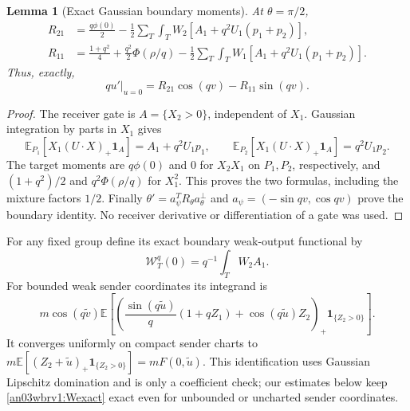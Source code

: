 \documentclass[11pt]{article}
\numberwithin{equation}{section}
\newtheorem{lemma}[theorem]{Lemma}
\theoremstyle{remark}\newtheorem{remark}[theorem]{Remark}
\newcommand{\E}{\mathbb E}\newcommand{\dd}{\,d}
\newcommand{\one}{\mathbf1}\newcommand{\KK}{\mathcal K}
\newcommand{\ph}{\phi(0)}\newcommand{\WW}{\mathcal W}
\begin{document}
\begin{lemma}[Exact Gaussian boundary moments]
\label{an03wbrv1:exact}
At $\theta=\pi/2$,
\begin{align}
 R_{21}&=\frac{q\ph}{2}
 -\frac12\sum_T\int_T W_2[A_1+q^2U_1(p_1+p_2)],
 \label{an03wbrv1:R21}\\
 R_{11}&=\frac{1+q^2}{4}+\frac{q^2}{2}\Phi(\rho/q)
 -\frac12\sum_T\int_T W_1[A_1+q^2U_1(p_1+p_2)].
 \label{an03wbrv1:R11}
\end{align}
Thus, exactly,
\begin{equation}
 qu'|_{u=0}=R_{21}\cos(qv)-R_{11}\sin(qv).
 \label{an03wbrv1:boundaryidentity}
\end{equation}
\end{lemma}
\begin{proof}
The receiver gate is $A=\{X_2>0\}$, independent of $X_1$.
Gaussian integration by parts in $X_1$ gives
\[
 \E_{P_1}[X_1(U\cdot X)_+\one_A]=A_1+q^2U_1p_1,
 \qquad
 \E_{P_2}[X_1(U\cdot X)_+\one_A]=q^2U_1p_2.
\]
The target moments are $q\ph$ and $0$ for $X_2X_1$ on
$P_1,P_2$, respectively, and $(1+q^2)/2$ and
$q^2\Phi(\rho/q)$ for $X_1^2$. This proves the two formulas,
including the mixture factors $1/2$. Finally
$\theta'=a_\psi^TR_\theta a_\theta^\perp$ and
$a_\psi=(-\sin qv,\cos qv)$ prove the boundary identity.
No receiver derivative or differentiation of a gate was used.
\end{proof}

For any fixed group define its exact boundary weak-output functional by
\begin{equation}
 \WW_T^q(0)=q^{-1}\int_T W_2 A_1.
 \label{an03wbrv1:Wexact}
\end{equation}
For bounded weak sender coordinates its integrand is
\[
 m\cos(q\widetilde v)\E\left[
 \left(\frac{\sin(q\widetilde u)}q(1+qZ_1)
             +\cos(q\widetilde u)Z_2\right)_+\one_{\{Z_2>0\}}\right].
\]
It converges uniformly on compact sender charts to
$m\E[(Z_2+\widetilde u)_+\one_{\{Z_2>0\}}]=mF(0,\widetilde u)$.
This identification uses Gaussian Lipschitz domination and is only a
coefficient check; our estimates below keep \eqref{an03wbrv1:Wexact}
exact even for unbounded or uncharted sender coordinates.
\end{document}
